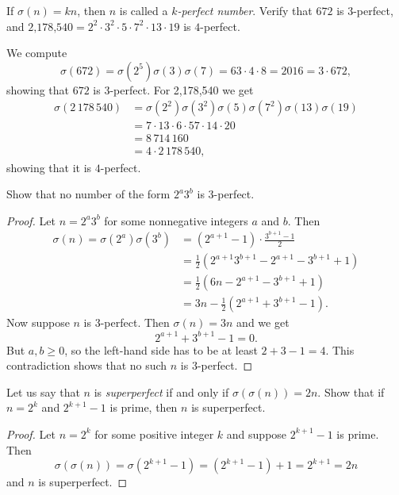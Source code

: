  If $\sigma(n) = kn$, then $n$ is called a {\em $k$-perfect
  number}. Verify that $672$ is $3$-perfect, and
$\text{2,178,540} = 2^2\cdot3^2\cdot5\cdot7^2\cdot13\cdot19$ is
$4$-perfect.
\begin{solution}
  We compute
  \begin{equation*}
    \sigma(672) = \sigma(2^5)\sigma(3)\sigma(7)
    = 63\cdot4\cdot8
    = 2016 = 3\cdot672,
  \end{equation*}
  showing that $672$ is $3$-perfect. For 2,178,540 we get
  \begin{align*}
    \sigma(2\,178\,540)
    &= \sigma(2^2)\sigma(3^2)\sigma(5)\sigma(7^2)\sigma(13)\sigma(19) \\
    &= 7\cdot13\cdot6\cdot57\cdot14\cdot20 \\
    &= 8\,714\,160 \\
    &= 4\cdot2\,178\,540,
  \end{align*}
  showing that it is $4$-perfect.
\end{solution}

 Show that no number of the form $2^a3^b$ is $3$-perfect.
\begin{proof}
  Let $n = 2^a3^b$ for some nonnegative integers $a$ and $b$. Then
  \begin{align*}
    \sigma(n) = \sigma(2^a)\sigma(3^b)
    &= (2^{a+1} - 1)\cdot\frac{3^{b+1} - 1}2 \\
    &= \frac12(2^{a+1}3^{b+1} - 2^{a+1} - 3^{b+1} + 1) \\
    &= \frac12(6n - 2^{a+1} - 3^{b+1} + 1) \\
    &= 3n - \frac12(2^{a+1} + 3^{b+1} - 1).
  \end{align*}
  Now suppose $n$ is $3$-perfect. Then $\sigma(n) = 3n$ and we get
  \begin{equation*}
    2^{a+1} + 3^{b+1} - 1 = 0.
  \end{equation*}
  But $a,b\geq0$, so the left-hand side has to be at least
  $2 + 3 - 1 = 4$. This contradiction shows that no such $n$ is
  $3$-perfect.
\end{proof}

 Let us say that $n$ is {\em superperfect}\/ if and only if
$\sigma(\sigma(n)) = 2n$. Show that if $n = 2^k$ and $2^{k+1} - 1$ is
prime, then $n$ is superperfect.
\begin{proof}
  Let $n = 2^k$ for some positive integer $k$ and suppose
  $2^{k+1} - 1$ is prime. Then
  \begin{equation*}
    \sigma(\sigma(n)) = \sigma(2^{k+1} - 1) = (2^{k+1} - 1) + 1
    = 2^{k+1} = 2n
  \end{equation*}
  and $n$ is superperfect.
\end{proof}
